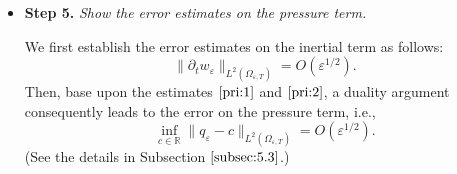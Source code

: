 \documentclass[13pt,CJK]{article}
\theoremstyle{plain}                       %
\theoremstyle{remark}
\numberwithin{equation}{section}
\begin{document}
\begin{itemize}
\begin{itemize}
\item \textbf{Step 5.} \emph{Show the error estimates on the pressure term.}

    We first establish the error estimates on the inertial term as follows:
\begin{equation}\label{pri:2}
 \|\partial_t w_\varepsilon\|_{L^2(\Omega_{\varepsilon,T})}
 = O(\varepsilon^{1/2}).
\end{equation}
Then, base upon the estimates $\eqref{pri:1}$ and $\eqref{pri:2}$,
a duality argument consequently leads to the error on the pressure
term, i.e.,
\begin{equation*}
 \inf_{c\in\mathbb{R}}\|q_\varepsilon-c\|_{L^2(\Omega_{\varepsilon,T})}
 = O(\varepsilon^{1/2}).
\end{equation*}
(See the details in Subsection $\ref{subsec:5.3}$.)
\end{itemize}

\end{itemize}


%
%
%
%
%







\end{document}
